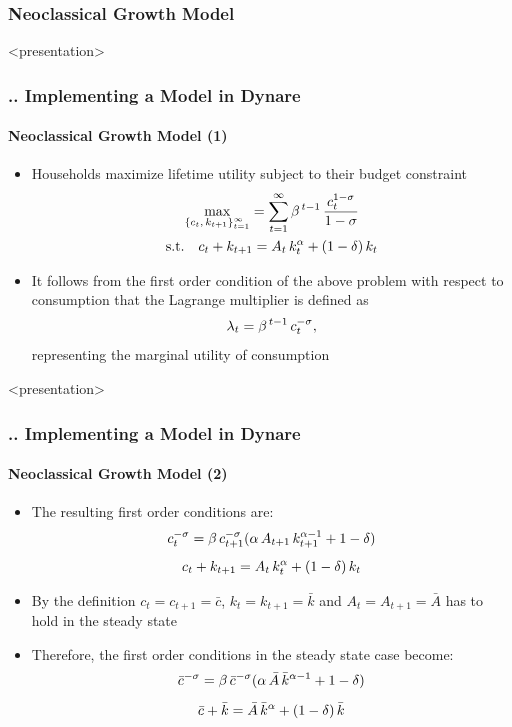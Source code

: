 \documentclass[11pt,aspectratio=169]{beamer}
\begin{document}
\subsubsection{Neoclassical Growth Model}
\begin{frame}<presentation>
\frametitle{{\thesection.\thesubsection.\thesubsubsection} Implementing a Model in Dynare}
\framesubtitle{Neoclassical Growth Model (1)}
	 \begin{itemize}
	 	\item Households maximize lifetime utility subject to their budget constraint 
	 	\begin{gather*}
	 	\underset{\left\{ c_t, \thinspace k_{t+1}\right\} _{t=1}^{\infty}}{\max} = \sum_{t=1}^{\infty} \beta^{\thinspace t-1} \thinspace \frac{c_t^{1-\sigma}}{1-\sigma}\\
	 	\text{s.t.} \quad c_t + k_{t+1} = A_t \thinspace k_t^{\alpha} + (1-\delta) \thinspace k_t
	 	\end{gather*}
	 	\item It follows from the first order condition of the above problem with respect to consumption that the Lagrange multiplier is defined as  $$\lambda_t=\beta^{\thinspace t-1}\thinspace c_t^{-\sigma},$$ representing the marginal utility of consumption
	\end{itemize}
\end{frame}
\begin{frame}<presentation>
\frametitle{{\thesection.\thesubsection.\thesubsubsection} Implementing a Model in Dynare}
\framesubtitle{Neoclassical Growth Model (2)}
	\begin{itemize}
		\item The resulting first order conditions are:
		\begin{gather*}
		c_t^{-\sigma} = \beta \thinspace c_{t+1}^{-\sigma} (\alpha \thinspace A_{t+1} \thinspace k_{t+1}^{\alpha -1} + 1 - \delta)\\[5pt]
		c_t + k_{t+1} = A_t \thinspace k_t^\alpha + (1-\delta) \thinspace k_t
		\end{gather*}
		\item By the definition $c_t=c_{t+1}=\bar{c}$, $k_t=k_{t+1}=\bar{k}$ and $A_t=A_{t+1}=\bar{A}$ has to hold in the steady state
		\item Therefore, the first order conditions in the steady state case become:
		\begin{gather*}
		\bar{c}^{-\sigma} = \beta \thinspace \bar{c}^{-\sigma} (\alpha \thinspace \bar{A} \thinspace \bar{k}^{\alpha -1} + 1 - \delta)\\[5pt]
		\bar{c} + \bar{k} = \bar{A} \thinspace \bar{k}^\alpha + (1-\delta) \thinspace \bar{k}
		\end{gather*}
	\end{itemize}
\end{frame}
\end{document}
